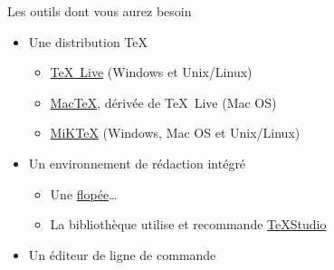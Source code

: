 \begin{frame}[c]{Les outils dont vous aurez besoin}
	
	\begin{itemize}
		\item Une distribution \TeX
			\begin{itemize}
				\item \href{https://www.tug.org/texlive/}{\TeX\ Live} (Windows et Unix/Linux)
				\item \href{https://www.tug.org/mactex/}{Mac\TeX}, dérivée de \TeX\ Live (Mac OS)
				\item \href{https://miktex.org/}{MiK\TeX} (Windows, Mac OS et Unix/Linux)
			\end{itemize}
		\item Un environnement de rédaction intégré
			\begin{itemize}
				\item Une \href{https://en.wikipedia.org/wiki/Comparison_of_TeX_editors}{flopée}\ldots
				\item La bibliothèque utilise et recommande \href{https://www.texstudio.org/}{%
					\TeX Studio}
			\end{itemize}
		\item Un éditeur de ligne de commande
	\end{itemize}
\end{frame}